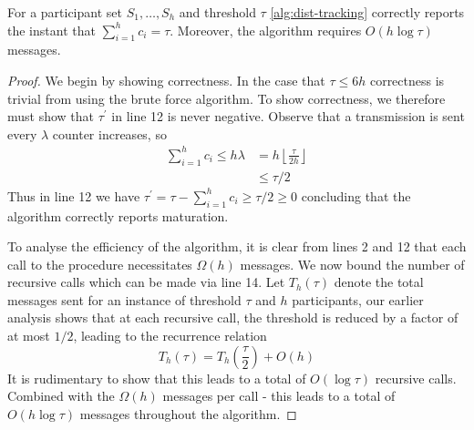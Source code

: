\begin{theorem}  For a participant set $S_1,\dots, S_h$ and threshold $\tau$ \cref{alg:dist-tracking} correctly reports the instant that $\sum_{i=1}^{h}c_i = \tau$. Moreover, the algorithm requires $O(h\log\tau)$ messages.
\end{theorem}
\begin{proof}
We begin by showing correctness. In the case that $\tau\leq6h$ correctness is trivial from using the brute force algorithm. To show correctness, we therefore must show that $\tau^\prime$ in line 12 is never negative. Observe that a transmission is sent every $\lambda$ counter increases, so 
\begin{align*}
    \sum_{i=1}^{h}c_i \leq h\lambda &= h \left\lfloor\frac{\tau}{2h} \right\rfloor \\
    &\leq \tau/2
\end{align*}
Thus in line 12 we have $\tau^\prime = \tau - \sum_{i=1}^{h}c_i\geq\tau/2 \geq 0$ concluding that the algorithm correctly reports maturation.

To analyse the efficiency of the algorithm, it is clear from lines 2 and 12 that each call to the procedure necessitates $\Omega(h)$ messages. We now bound the number of recursive calls which can be made via line 14. Let $T_h(\tau)$ denote the total messages sent for an instance of threshold $\tau$ and $h$ participants, our earlier analysis shows that at each recursive call, the threshold is reduced by a factor of at most $1/2$, leading to the recurrence relation
$$T_h(\tau) = T_h\left(\frac{\tau}{2}\right) + O(h)$$
It is rudimentary to show that this leads to a total of $O(\log\tau)$ recursive calls. Combined with the $\Omega(h)$ messages per call - this leads to a total of $O(h\log\tau)$ messages throughout the algorithm.
\end{proof}
